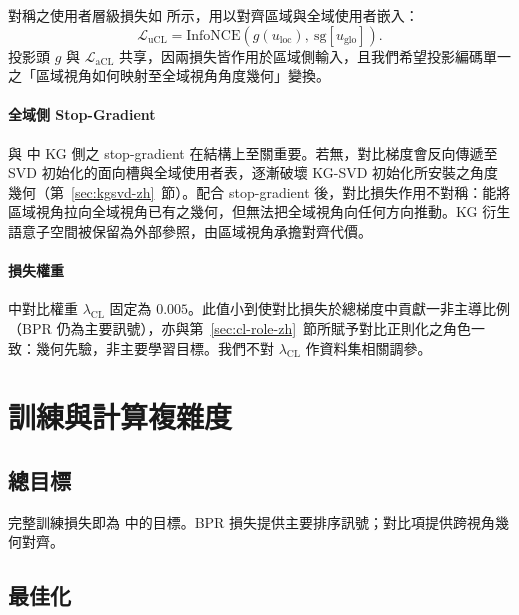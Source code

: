 對稱之使用者層級損失如  所示，用以對齊區域與全域使用者嵌入：
\begin{equation}
\label{eq:lucl-zh}
\mathcal{L}_{\mathrm{uCL}} = \mathrm{InfoNCE}\!\left( g(u_{\mathrm{loc}}),\ \mathrm{sg}\!\left[u_{\mathrm{glo}}\right] \right).
\end{equation}
投影頭 $g$ 與 $\mathcal{L}_{\mathrm{aCL}}$ 共享，因兩損失皆作用於區域側輸入，且我們希望投影編碼單一之「區域視角如何映射至全域視角角度幾何」變換。

\paragraph{全域側 Stop-Gradient}
\label{sec:cl-stopgrad-zh}

 與  中 KG 側之 stop-gradient 在結構上至關重要。若無，對比梯度會反向傳遞至 SVD 初始化的面向槽與全域使用者表，逐漸破壞 KG-SVD 初始化所安裝之角度幾何（第~\ref{sec:kgsvd-zh}~節）。配合 stop-gradient 後，對比損失作用不對稱：能將區域視角拉向全域視角已有之幾何，但無法把全域視角向任何方向推動。KG 衍生語意子空間被保留為外部參照，由區域視角承擔對齊代價。

\paragraph{損失權重}
\label{sec:cl-lambda-zh}

 中對比權重 $\lambda_{\mathrm{CL}}$ 固定為 $0.005$。此值小到使對比損失於總梯度中貢獻一非主導比例（BPR 仍為主要訊號），亦與第~\ref{sec:cl-role-zh}~節所賦予對比正則化之角色一致：幾何先驗，非主要學習目標。我們不對 $\lambda_{\mathrm{CL}}$ 作資料集相關調參。

\section{訓練與計算複雜度}
\label{sec:method-train-zh}

\subsection{總目標}
\label{sec:train-objective-zh}

完整訓練損失即為  中的目標。BPR 損失提供主要排序訊號；對比項提供跨視角幾何對齊。

\subsection{最佳化}
\label{sec:train-opt-zh}

